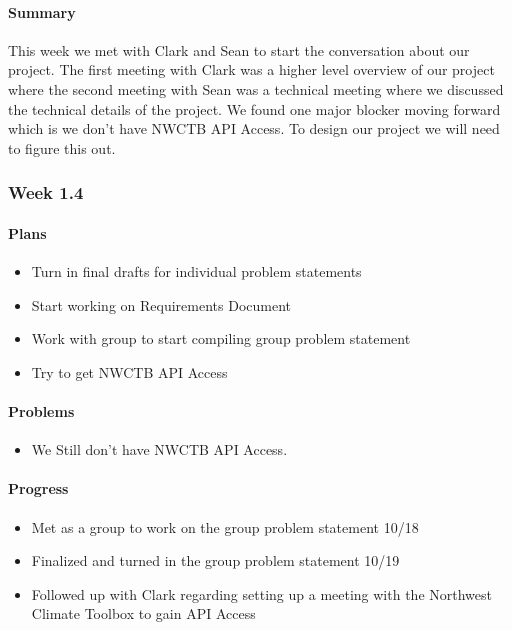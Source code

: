 \documentclass[onecolumn, draftclsnofoot,10pt, compsoc]{article}
\begin{document}
		    \paragraph{Summary} \hfill \break
		    	This week we met with Clark and Sean to start the conversation about our project. The first meeting with Clark was a higher level overview of our project where the second meeting with Sean was a technical meeting where we discussed the technical details of the project. We found one major blocker moving forward which is we don't have NWCTB API Access. To design our project we will need to figure this out.\\

		\subsubsection{Week 1.4}

		    \paragraph{Plans} \hfill \break

		        \begin{itemize}
		            \item Turn in final drafts for individual problem statements
		            \item Start working on Requirements Document
		            \item Work with group to start compiling group problem statement
		            \item Try to get NWCTB API Access
		        \end{itemize}

		    \paragraph{Problems} \hfill \break

		        \begin{itemize}
		            \item We Still don't have NWCTB API Access.
		        \end{itemize}

		    \paragraph{Progress} \hfill \break

		        \begin{itemize}
		            \item Met as a group to work on the group problem statement 10/18
		            \item Finalized and turned in the group problem statement 10/19
		            \item Followed up with Clark regarding setting up a meeting with the Northwest Climate Toolbox to gain API Access
		        \end{itemize}
\end{document}
